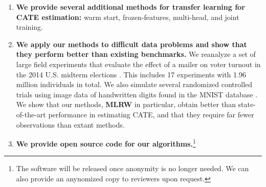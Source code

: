 \begin{enumerate}
\item \textbf{We provide several additional methods for transfer learning for CATE estimation:} warm start, frozen-features, multi-head, and joint training.

\item \textbf{We apply our methods to difficult data problems and show that they perform better than existing benchmarks.} We reanalyze a set of large field experiments that evaluate the effect of a mailer on voter turnout in the 2014 U.S. midterm elections \citep{gerber2017generalizability}. This includes 17 experiments with 1.96 million individuals in total. We also simulate several randomized controlled trials using image data of handwritten digits found in the MNIST database \citep{lecun1998mnist}. We show that our methods, \textbf{MLRW} in particular, obtain better than state-of-the-art performance in estimating CATE, and that they require far fewer observations than extant methods.

\item \textbf{We provide open source code for our algorithms.}\footnote{The software will be released once anonymity is no longer needed. We can also provide an anynomized copy to reviewers upon request.} 
\end{enumerate}


